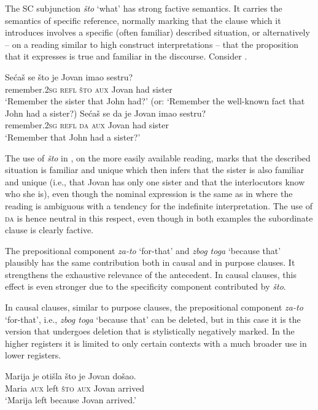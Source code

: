 \documentclass[output=paper,
colorlinks,
citecolor=brown,
newtxmath
]{langscibook}
\begin{document}
\noindent The SC subjunction \textit{što} `what' has strong factive semantics. It carries the semantics of specific reference, normally marking that the clause which it introduces involves a specific (often familiar) described situation, or alternatively -- on a reading similar to high construct interpretations -- that the proposition that it expresses is true and familiar in the discourse. Consider .

\ea\label{ex:Sto-da}
    \ea \gll Sećaš se što je Jovan imao sestru?\\
    remember.\textsc{2sg} \textsc{refl} \textsc{što} \textsc{aux} Jovan had sister\\
    \glt `Remember the sister that John had?'
    \glt (or: `Remember the well-known fact that John had a sister?)\label{ex:Što-da-a}
	\ex \gll Sećaš se da je Jovan imao sestru?\\
    remember.\textsc{2sg} \textsc{refl} \textsc{da} \textsc{aux} Jovan had sister\\
    \glt `Remember that John had a sister?'\label{ex:Što-da-b}
\z\z

\noindent The use of \textit{što} in , on the more easily available reading, marks that the described situation is familiar and unique which then infers that the sister is also familiar and unique (i.e., that Jovan has only one sister and that the interlocutors know who she is), even though the nominal expression is the same as in  where the reading is ambiguous with a tendency for the indefinite interpretation. The use of \textsc{da} is hence neutral in this respect, even though in both examples the subordinate clause is clearly factive.

The prepositional component \textit{za-to} `for-that' and \textit{zbog toga} `because that' plausibly has the same contribution both in causal and in purpose clauses. It strengthens the exhaustive relevance of the antecedent. In causal clauses, this effect is even stronger due to the specificity component contributed by \textit{što}.

In causal clauses, similar to purpose clauses, the prepositional component \textit{za-to} `for-that', i.e., \textit{zbog toga} `because that' can be deleted, but in this case it is the version that undergoes deletion that is stylistically negatively marked. In the higher registers it is limited to only certain contexts with a much broader use in lower registers.

\ea\label{ex:elide-zato}
    \gll Marija je otišla što je Jovan došao.\\
    Maria \textsc{aux} left \textsc{što} \textsc{aux} Jovan arrived\\
    \glt `Marija left because Jovan arrived.'
\z
\end{document}
